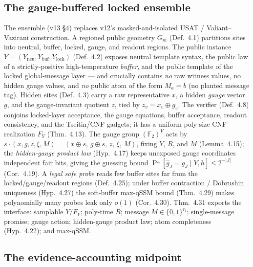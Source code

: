 \documentclass[11pt]{article}
\theoremstyle{definition}
\newcommand{\FF}{\mathbb{F}_2}
\begin{document}
\subsection{The gauge-buffered locked ensemble}
\label{sec:ensemble}

The ensemble (v13 \S4) replaces v12's masked-and-isolated USAT / Valiant--Vazirani
construction. A regioned public geometry $G_m$ (Def.~4.1) partitions sites into
neutral, buffer, locked, gauge, and readout regions. The public instance
$Y=(Y_{\mathrm{neu}},Y_{\mathrm{buf}},Y_{\mathrm{lock}})$ (Def.~4.2) exposes
neutral template syntax, the public law of a strictly-positive high-temperature
\emph{buffer}, and the public template of the locked global-message layer --- and
crucially contains \emph{no} raw witness values, no hidden gauge values, and
\emph{no} public atom of the form $M_a=b$ (no planted message tag). Hidden sites
(Def.~4.3) carry a raw representative $x$, a hidden \emph{gauge} vector $g$, and
the gauge-invariant quotient $z$, tied by $z_v=x_v\oplus g_v$. The verifier
(Def.~4.8) conjoins locked-layer acceptance, the gauge equations, buffer
acceptance, readout consistency, and the Tseitin/CNF gadgets; it has a uniform
poly-size CNF realization $F_Y$ (Thm.~4.13). The gauge group $(\FF)^V$ acts by
$s\cdot(x,g,z,\xi,M)=(x\oplus s,\,g\oplus s,\,z,\,\xi,\,M)$, fixing $Y$, $R$, and
$M$ (Lemma~4.15); the \emph{hidden-gauge product law} (Hyp.~4.17) keeps unexposed
gauge coordinates independent fair bits, giving the guessing bound
$\Pr[\hat g_J=g_J\mid Y,h]\le 2^{-|J|}$ (Cor.~4.19). A \emph{legal safe probe}
reads few buffer sites far from the locked/gauge/readout regions (Def.~4.25);
under buffer contraction / Dobrushin uniqueness (Hyp.~4.27) the soft-buffer
max-qSSM bound (Thm.~4.29) makes polynomially many probes leak only $o(1)$
(Cor.~4.30). Thm.~4.31 exports the interface: samplable $Y/F_Y$; poly-time $R$;
message $M\in\{0,1\}^{r_t}$; single-message promise; gauge action; hidden-gauge
product law; atom completeness (Hyp.~4.22); and max-qSSM.

\subsection{The evidence-accounting midpoint}
\label{sec:midpoint}
\end{document}
